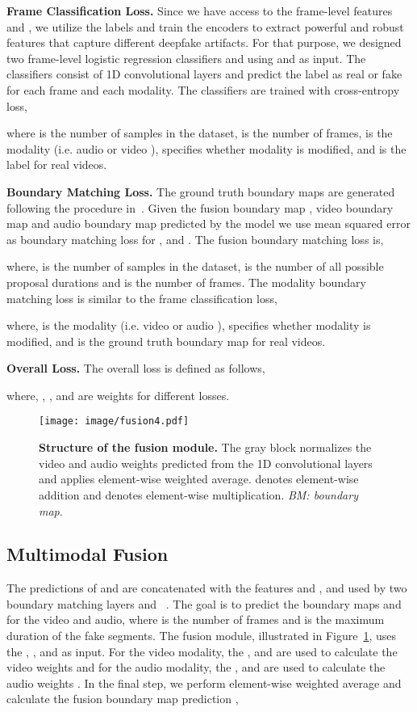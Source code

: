 \documentclass[conference, a4paper]{IEEEtran}
\makeatletter
\newcommand*{\ie}{i.e.\@\xspace}
\makeatother
\begin{document}
\noindent \textbf{Frame Classification Loss.} Since we have access to the frame-level features  and , we utilize the labels and train the encoders to extract powerful and robust features that capture different deepfake artifacts. For that purpose, we designed two frame-level logistic regression classifiers  and  using  and  as input. The classifiers consist of 1D convolutional layers and predict the label  as real or fake for each frame and each modality. The classifiers are trained with cross-entropy loss,



where  is the number of samples in the dataset,  is the number of frames,  is the modality (\ie audio  or video ),  specifies whether modality  is modified, and  is the label for real videos.

\noindent \textbf{Boundary Matching Loss.} The ground truth boundary maps are generated following the procedure in~\cite{lin_bmn_2019}. Given the fusion boundary map , video boundary map  and audio boundary map  predicted by the model we use mean squared error as boundary matching loss for ,  and . The fusion boundary matching loss is,

where,  is the number of samples in the dataset,  is the number of all possible proposal durations and  is the number of frames. The modality boundary matching loss is similar to the frame classification loss,


where,  is the modality (\ie video  or audio ),  specifies whether modality  is modified, and  is the ground truth boundary map for real videos.

\noindent \textbf{Overall Loss.} The overall loss is defined as follows,

where, , ,  and  are weights for different losses.

\begin{figure}[t]
\centering
\texttt{[image: image/fusion4.pdf]}
\caption{\textbf{Structure of the fusion module.} The gray block normalizes the video and audio weights predicted from the 1D convolutional layers and applies element-wise weighted average.  denotes element-wise addition and  denotes element-wise multiplication. \textit{BM: boundary map}.}
\label{fig:fusion}
\end{figure}

\subsection{Multimodal Fusion}
The predictions of  and  are concatenated with the features  and , and used by two boundary matching layers  and ~\cite{lin_bmn_2019}. The goal is to predict the boundary maps  and  for the video and audio, where  is the number of frames and  is the maximum duration of the fake segments. The fusion module, illustrated in Figure~\ref{fig:fusion}, uses the , ,  and  as input. For the video modality, the ,  and  are used to calculate the video weights  and for the audio modality, the ,  and  are used to calculate the audio weights . In the final step, we perform element-wise weighted average and calculate the fusion boundary map prediction ,
\end{document}
